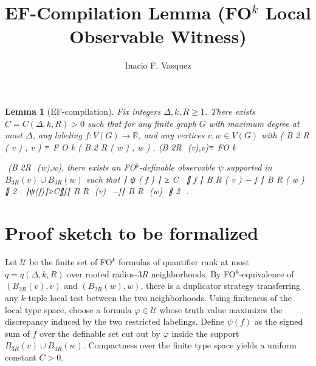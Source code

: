 \documentclass{article}
\title{EF-Compilation Lemma (FO$^k$ Local Observable Witness)}
\author{Inacio F. Vasquez}
\date{}
\newtheorem{lemma}{Lemma}
\begin{document}
\maketitle
\begin{lemma}[EF-compilation]
Fix integers $\Delta,k,R\ge 1$. There exists $C=C(\Delta,k,R)>0$ such that for any finite graph $G$ with maximum degree at most $\Delta$, any labeling $f:V(G)\to\mathbb{R}$, and any vertices $v,w\in V(G)$ with
(
B
2
R
(
v
)
,
v
)
≡
F
O
k
(
B
2
R
(
w
)
,
w
)
,
(B 
2R
​	
 (v),v)≡ 
FO 
k
 
​	
 (B 
2R
​	
 (w),w),
there exists an FO$^k$-definable observable $\psi$ supported in $B_{3R}(v)\cup B_{3R}(w)$ such that
∣
ψ
(
f
)
∣
≥
C
 
∥
f
∣
B
R
(
v
)
−
f
∣
B
R
(
w
)
∥
2
.
∣ψ(f)∣≥C∥f∣ 
B 
R
​	
 (v)
​	
 −f∣ 
B 
R
​	
 (w)
​	
 ∥ 
2
​	
 .
\end{lemma}
\section*{Proof sketch to be formalized}
Let $\mathcal{U}$ be the finite set of FO$^k$ formulas of quantifier rank at most $q=q(\Delta,k,R)$ over rooted radius-$3R$ neighborhoods.
By FO$^k$-equivalence of $(B_{2R}(v),v)$ and $(B_{2R}(w),w)$, there is a duplicator strategy transferring any $k$-tuple local test between the two neighborhoods.
Using finiteness of the local type space, choose a formula $\varphi\in\mathcal{U}$ whose truth value maximizes the discrepancy induced by the two restricted labelings.
Define $\psi(f)$ as the signed sum of $f$ over the definable set cut out by $\varphi$ inside the support $B_{3R}(v)\cup B_{3R}(w)$.
Compactness over the finite type space yields a uniform constant $C>0$.
\end{document}
